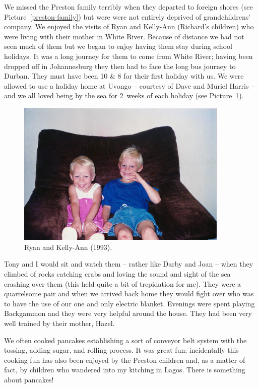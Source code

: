 We missed the Preston family terribly when they departed to foreign
shores (see Picture~\ref{preston-family}) but were were not entirely
deprived of grandchildrens' company. We enjoyed the visits of Ryan and
Kelly-Ann (Richard's children) who were living with their mother in
White River. Because of distance we had not seen much of them but we
began to enjoy having them stay during school holidays. It was a long
journey for them to come from White River; having been dropped off in
Johannesburg they then had to face the long bus journey to
Durban. They must have been 10 \& 8 for their first holiday with
us. We were allowed to use a holiday home at Uvongo -- courtesy of
Dave and Muriel Harris -- and we all loved being by the sea for
2~weeks of each holiday (see Picture~\ref{ryan-kelly-ann}).

\begin{figure}
  \centering
  \includegraphics[width=0.9\textwidth]{photos/ryan-and-kelly-ann.jpg}
  \caption{Ryan and Kelly-Ann (1993).}
  \label{ryan-kelly-ann}
\end{figure}

Tony and I would sit and watch them -- rather like Darby and Joan --
when they climbed of rocks catching crabs and loving the sound and
sight of the sea crashing over them (this held quite a bit of
trepidation for me). They were a quarrelsome pair and when we arrived
back home they would fight over who was to have the use of our one and
only electric blanket. Evenings were spent playing Backgammon and they
were very helpful around the house. They had been very well trained by
their mother, Hazel.

We often cooked pancakes establishing a sort of conveyor belt system
with the tossing, adding sugar, and rolling process. It was great fun;
incidentally this cooking fun has also been enjoyed by the Preston
children and, as a matter of fact, by children who wandered into my
kitching in Lagos. There is something about pancakes!

